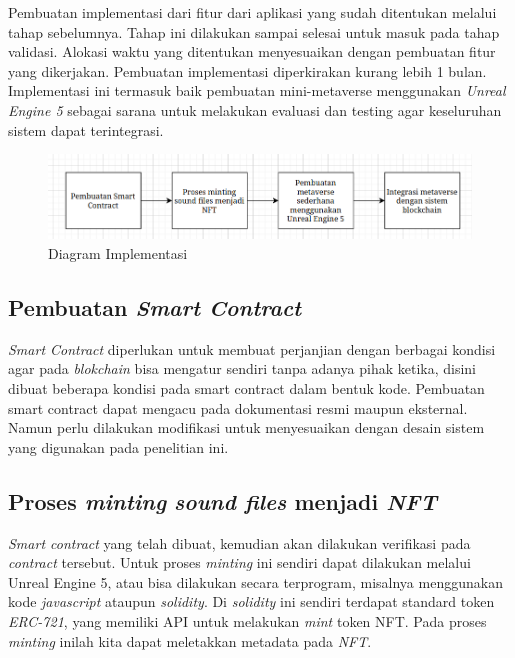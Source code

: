 Pembuatan implementasi dari fitur dari aplikasi yang sudah ditentukan melalui tahap
sebelumnya. Tahap ini dilakukan sampai selesai untuk masuk pada tahap validasi. Alokasi
waktu yang ditentukan menyesuaikan dengan pembuatan fitur yang dikerjakan. Pembuatan
implementasi diperkirakan kurang lebih 1 bulan. Implementasi ini termasuk baik pembuatan mini-metaverse
menggunakan \emph{Unreal Engine 5} sebagai sarana untuk melakukan evaluasi dan testing agar keseluruhan sistem dapat terintegrasi.

\begin{figure} [ht] \centering
  \includegraphics[scale=0.60]{gambar/diagramimplementasi.png}
  \caption{Diagram Implementasi}
  \label{fig:diagramimplementasi}
\end{figure}

\subsection{Pembuatan \emph{Smart Contract}}
\emph{Smart Contract} diperlukan untuk membuat perjanjian dengan
berbagai kondisi agar pada \emph{blokchain} bisa mengatur sendiri tanpa
adanya pihak ketika, disini dibuat beberapa kondisi pada
smart contract dalam bentuk kode. Pembuatan smart contract dapat mengacu pada dokumentasi resmi maupun eksternal.
Namun perlu dilakukan modifikasi untuk menyesuaikan dengan desain sistem yang digunakan pada penelitian
ini.

\subsection{Proses \emph{minting} \emph{sound files} menjadi \emph{NFT}}
\emph{Smart contract} yang telah dibuat, kemudian akan dilakukan verifikasi pada \emph{contract} tersebut. Untuk proses \emph{minting} ini sendiri
dapat dilakukan melalui Unreal Engine 5, atau bisa dilakukan secara terprogram, misalnya menggunakan kode \emph{javascript} ataupun \emph{solidity}.
Di \emph{solidity} ini sendiri terdapat standard token \emph{ERC-721}, yang memiliki API untuk melakukan \emph{mint} token NFT. Pada proses \emph{minting}
inilah kita dapat meletakkan metadata pada \emph{NFT}.

